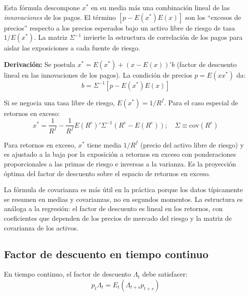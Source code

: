 \documentclass[12pt]{article}
\begin{document}
\begin{intuicionmat}
Esta f\'ormula descompone $x^*$ en su media m\'as una combinaci\'on lineal de las \emph{innovaciones} de los pagos. El t\'ermino $[p - E(x^*)E(x)]$ son los ``excesos de precios'' respecto a los precios esperados bajo un activo libre de riesgo de tasa $1/E(x^*)$. La matriz $\Sigma^{-1}$ invierte la estructura de correlaci\'on de los pagos para aislar las exposiciones a cada fuente de riesgo.
\end{intuicionmat}

\textbf{Derivaci\'on:} Se postula $x^* = E(x^*) + (x - E(x))'b$ (factor de descuento lineal en las innovaciones de los pagos). La condici\'on de precios $p = E(xx^*)$ da:
\begin{equation}
    b = \Sigma^{-1}[p - E(x^*)E(x)]
\end{equation}

Si se negocia una tasa libre de riesgo, $E(x^*) = 1/R^f$. Para el caso especial de retornos en exceso:
\begin{equation}
    x^* = \frac{1}{R^f} - \frac{1}{R^f} E(R^e)' \Sigma^{-1}(R^e - E(R^e)); \quad \Sigma \equiv \text{cov}(R^e)
\end{equation}

\begin{intuicionmat}
Para retornos en exceso, $x^*$ tiene media $1/R^f$ (precio del activo libre de riesgo) y es ajustado a la baja por la exposici\'on a retornos en exceso con ponderaciones proporcionales a las primas de riesgo e inversas a la varianza. Es la proyecci\'on \'optima del factor de descuento sobre el espacio de retornos en exceso.
\end{intuicionmat}

\begin{intuicion}
La f\'ormula de covarianza es m\'as \'util en la pr\'actica porque los datos t\'ipicamente se resumen en medias y covarianzas, no en segundos momentos. La estructura es an\'aloga a la regresi\'on: el factor de descuento es lineal en los retornos, con coeficientes que dependen de los precios de mercado del riesgo y la matriz de covarianza de los activos.
\end{intuicion}

\subsection{Factor de descuento en tiempo continuo}

En tiempo continuo, el factor de descuento $\Lambda_t$ debe satisfacer:
\begin{equation}
    p_t \Lambda_t = E_t(\Lambda_{t+s} p_{t+s})
\end{equation}
\end{document}
